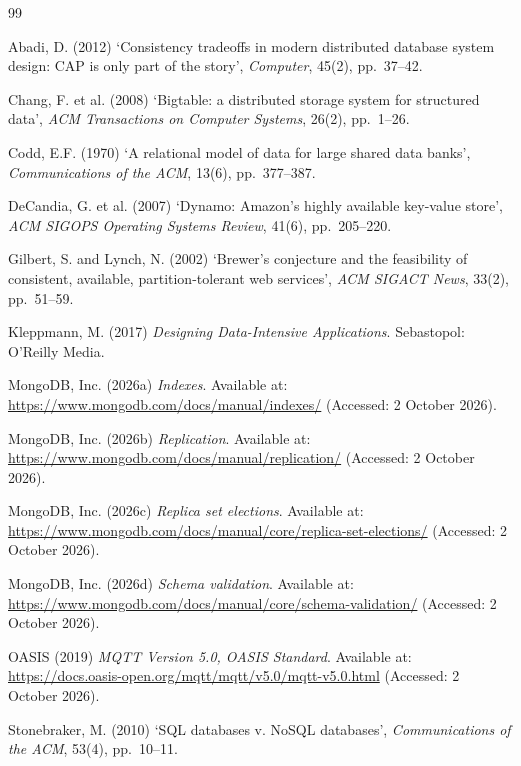 \documentclass[11pt,a4paper]{article}
\begin{document}
\clearpage
\begin{thebibliography}{99}
\setlength{\itemsep}{0.4em}

 Abadi, D. (2012) `Consistency tradeoffs in modern distributed database system design: CAP is only part of the story', \textit{Computer}, 45(2), pp.~37--42.

 Chang, F. et al. (2008) `Bigtable: a distributed storage system for structured data', \textit{ACM Transactions on Computer Systems}, 26(2), pp.~1--26.

 Codd, E.F. (1970) `A relational model of data for large shared data banks', \textit{Communications of the ACM}, 13(6), pp.~377--387.

 DeCandia, G. et al. (2007) `Dynamo: Amazon's highly available key-value store', \textit{ACM SIGOPS Operating Systems Review}, 41(6), pp.~205--220.

 Gilbert, S. and Lynch, N. (2002) `Brewer's conjecture and the feasibility of consistent, available, partition-tolerant web services', \textit{ACM SIGACT News}, 33(2), pp.~51--59.

 Kleppmann, M. (2017) \textit{Designing Data-Intensive Applications}. Sebastopol: O'Reilly Media.

 MongoDB, Inc. (2026a) \textit{Indexes}. Available at: \url{https://www.mongodb.com/docs/manual/indexes/} (Accessed: 2 October 2026).

 MongoDB, Inc. (2026b) \textit{Replication}. Available at: \url{https://www.mongodb.com/docs/manual/replication/} (Accessed: 2 October 2026).

 MongoDB, Inc. (2026c) \textit{Replica set elections}. Available at: \url{https://www.mongodb.com/docs/manual/core/replica-set-elections/} (Accessed: 2 October 2026).

 MongoDB, Inc. (2026d) \textit{Schema validation}. Available at: \url{https://www.mongodb.com/docs/manual/core/schema-validation/} (Accessed: 2 October 2026).

 OASIS (2019) \textit{MQTT Version 5.0, OASIS Standard}. Available at: \url{https://docs.oasis-open.org/mqtt/mqtt/v5.0/mqtt-v5.0.html} (Accessed: 2 October 2026).

 Stonebraker, M. (2010) `SQL databases v. NoSQL databases', \textit{Communications of the ACM}, 53(4), pp.~10--11.

\end{thebibliography}
\end{document}
